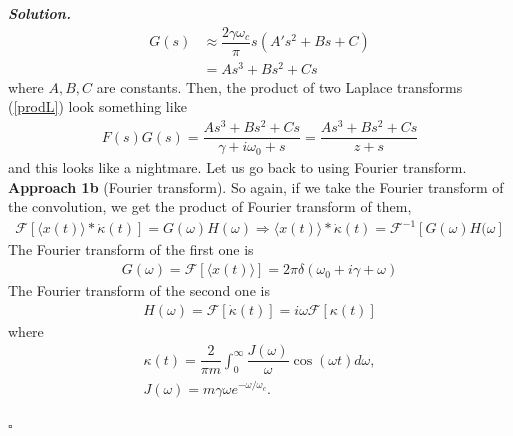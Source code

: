 \documentclass[12pt]{article}
\newenvironment{solution}[1][\it{Solution}]{\textbf{#1. } }{$\square$}
\begin{document}
\begin{solution}
\begin{align}
    G(s) &\approx \dfrac{2\gamma\omega_c}{\pi}s\left(A's^2+Bs+C\right)\\
    &=As^3+Bs^2+Cs
\end{align}
where $A, B, C$ are constants. Then, the product of two Laplace transforms (\ref{prodL}) look something like
\begin{align}
    F(s)G(s) = \dfrac{As^3+Bs^2+Cs}{\gamma + i\omega_0+s}=\dfrac{As^3+Bs^2+Cs}{z+s}
\end{align}
and this looks like a nightmare. Let us go back to using Fourier transform.\newline\\
\noindent\textbf{Approach 1b} (Fourier transform). So again, if we take the Fourier transform of the convolution, we get the product of Fourier transform of them,
\begin{align}
    \mathcal{F}\left[\langle x(t)\rangle * \dot{\kappa}(t)\right]=G(\omega)H(\omega) \Rightarrow \langle x(t)\rangle *\dot{\kappa}(t)=\mathcal{F}^{-1}[G(\omega)H(\omega]
\end{align}
The Fourier transform of the first one is
\begin{align}
    G(\omega) = \mathcal{F}\left[\langle x(t)\rangle\right] = 2\pi \delta(\omega_0+i\gamma+\omega)
\end{align}
The Fourier transform of the second one is 
\begin{align}
    H(\omega) = \mathcal{F}\left[\dot{\kappa}(t)\right] = i\omega \mathcal{F}\left[\kappa(t)\right]
\end{align}
where 
\begin{align}
    \kappa(t) = \dfrac{2}{\pi m}\int_0^\infty \dfrac{J(\omega)}{\omega}\cos(\omega t)d\omega,\\
    J(\omega) = m\gamma\omega e^{-\omega/\omega_c}.
\end{align}

\end{solution} 

 
\end{document}
